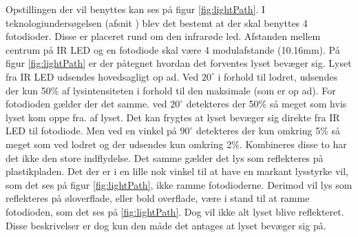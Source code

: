 \documentclass[HardwareDesign/HardwareDesign_main.tex]{subfiles}
\begin{document}
Opstillingen der vil benyttes kan ses på figur \ref{fig:lightPath}. I teknologiundersøgelsen (afsnit ) blev det bestemt at der skal benyttes 4 fotodioder. Disse er placeret rund om den infrarøde led. Afstanden mellem centrum på IR LED og en fotodiode skal være 4 modulafstande (10.16mm). På figur \ref{fig:lightPath} er der påtegnet hvordan det forventes lyset bevæger sig. Lyset fra IR LED udsendes hovedsagligt op ad. Ved $20^\circ$ i forhold til lodret, udsendes der kun 50\% af lysintensiteten i forhold til den maksimale (som er op ad)\autocite[3, 8]{SFH485}. For fotodioden gælder der det samme. ved $20^\circ$ detekteres der 50\% så meget som hvis lyset kom oppe fra. af lyset\autocite[2,6]{SFH203FA}. Det kan frygtes at lyset bevæger sig direkte fra IR LED til fotodiode. Men ved en vinkel på $90^\circ$ detekteres der kun omkring 5\% så meget som ved lodret\autocite[6]{SFH203FA} og der udsendes kun omkring 2\%\autocite[8]{SFH485}. Kombineres disse to har det ikke den store indflydelse. Det samme gælder det lys som reflekteres på plastikpladen. Det der er i en lille nok vinkel til at have en markant lysstyrke vil, som det ses på figur \ref{fig:lightPath}, ikke ramme fotodioderne. Derimod vil lys som reflekteres på øloverflade, eller bold overflade, være i stand til at ramme fotodioden, som det ses på \ref{fig:lightPath}. Dog vil ikke alt lyset blive reflekteret. Disse beskrivelser er dog kun den måde det antages at lyset bevæger sig på.
\end{document}
